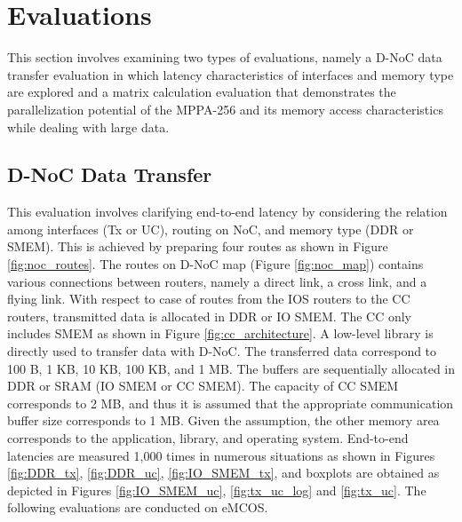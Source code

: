 \documentclass{sig-alternate-05-2015}
\begin{document}

\section{Evaluations}
\label{sec:evaluations}
This section involves examining two types of evaluations, namely a D-NoC data transfer evaluation in which latency characteristics of interfaces and memory type are explored and a matrix calculation evaluation that demonstrates the parallelization potential of the MPPA-256 and its memory access characteristics while dealing with large data.

\subsection{D-NoC Data Transfer}
\label{sec:dnoc_eval}
This evaluation involves clarifying end-to-end latency by considering the relation among interfaces (Tx or UC), routing on NoC, and memory type (DDR or SMEM).
This is achieved by preparing four routes as shown in Figure \ref{fig:noc_routes}.
The routes on D-NoC map (Figure \ref{fig:noc_map}) contains various connections between routers, namely a direct link, a cross link, and a flying link.
With respect to case of routes from the IOS routers to the CC routers, transmitted data is allocated in DDR or IO SMEM.
The CC only includes SMEM as shown in Figure \ref{fig:cc_architecture}.
A low-level library is directly used to transfer data with D-NoC.
The transferred data correspond to 100 B, 1 KB, 10 KB, 100 KB, and 1 MB.
The buffers are sequentially allocated in DDR or SRAM (IO SMEM or CC SMEM).
The capacity of CC SMEM corresponds to 2 MB, and thus it is assumed that the appropriate communication buffer size corresponds to 1 MB.
Given the assumption, the other memory area corresponds to the application, library, and operating system.
End-to-end latencies are measured 1,000 times in numerous situations as shown in Figures \ref{fig:DDR_tx}, \ref{fig:DDR_uc}, \ref{fig:IO_SMEM_tx}, and boxplots are obtained as depicted in Figures \ref{fig:IO_SMEM_uc}, \ref{fig:tx_uc_log} and \ref{fig:tx_uc}.
The following evaluations are conducted on eMCOS.
\end{document}

